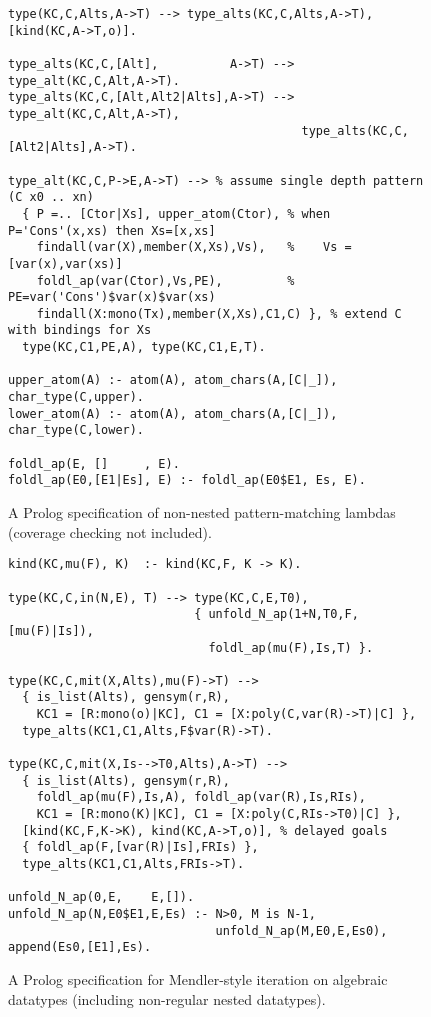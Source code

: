 \documentclass[runningheads,a4paper]{llncs}
\begin{document}
\begin{figure} %
\begin{verbatim}
type(KC,C,Alts,A->T) --> type_alts(KC,C,Alts,A->T), [kind(KC,A->T,o)].

type_alts(KC,C,[Alt],          A->T) --> type_alt(KC,C,Alt,A->T).
type_alts(KC,C,[Alt,Alt2|Alts],A->T) --> type_alt(KC,C,Alt,A->T),
                                         type_alts(KC,C,[Alt2|Alts],A->T).

type_alt(KC,C,P->E,A->T) --> % assume single depth pattern (C x0 .. xn)
  { P =.. [Ctor|Xs], upper_atom(Ctor), % when P='Cons'(x,xs) then Xs=[x,xs]
    findall(var(X),member(X,Xs),Vs),   %    Vs = [var(x),var(xs)]  
    foldl_ap(var(Ctor),Vs,PE),         %    PE=var('Cons')$var(x)$var(xs)
    findall(X:mono(Tx),member(X,Xs),C1,C) }, % extend C with bindings for Xs
  type(KC,C1,PE,A), type(KC,C1,E,T).

upper_atom(A) :- atom(A), atom_chars(A,[C|_]), char_type(C,upper).
lower_atom(A) :- atom(A), atom_chars(A,[C|_]), char_type(C,lower).

foldl_ap(E, []     , E).
foldl_ap(E0,[E1|Es], E) :- foldl_ap(E0$E1, Es, E).
\end{verbatim}
\vspace*{-2ex}
\caption{A Prolog specification of non-nested pattern-matching lambdas
$\qquad$ (coverage checking not included).}
\label{fig:patlam}
\end{figure}
\begin{figure} %
\begin{verbatim}
kind(KC,mu(F), K)  :- kind(KC,F, K -> K).

type(KC,C,in(N,E), T) --> type(KC,C,E,T0),
                          { unfold_N_ap(1+N,T0,F,[mu(F)|Is]),
                            foldl_ap(mu(F),Is,T) }.

type(KC,C,mit(X,Alts),mu(F)->T) -->
  { is_list(Alts), gensym(r,R),
    KC1 = [R:mono(o)|KC], C1 = [X:poly(C,var(R)->T)|C] },
  type_alts(KC1,C1,Alts,F$var(R)->T).

type(KC,C,mit(X,Is-->T0,Alts),A->T) -->
  { is_list(Alts), gensym(r,R),
    foldl_ap(mu(F),Is,A), foldl_ap(var(R),Is,RIs),
    KC1 = [R:mono(K)|KC], C1 = [X:poly(C,RIs->T0)|C] },
  [kind(KC,F,K->K), kind(KC,A->T,o)], % delayed goals
  { foldl_ap(F,[var(R)|Is],FRIs) },
  type_alts(KC1,C1,Alts,FRIs->T).

unfold_N_ap(0,E,    E,[]).
unfold_N_ap(N,E0$E1,E,Es) :- N>0, M is N-1,
                             unfold_N_ap(M,E0,E,Es0), append(Es0,[E1],Es).
\end{verbatim}
\vspace*{-1ex}
\caption{A Prolog specification for Mendler-style iteration
  on algebraic datatypes (including non-regular nested datatypes).}
\label{fig:mit}
\end{figure}
\end{document}
